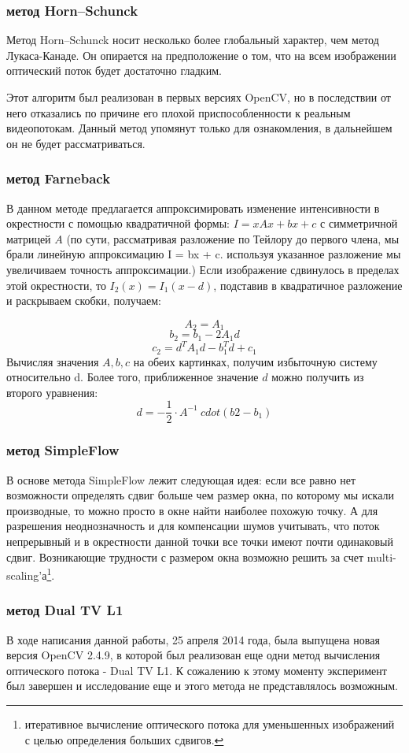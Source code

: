 \subsubsection{метод Horn–Schunck}
Метод Horn–Schunck носит несколько более глобальный характер, чем метод Лукаса-Канаде. Он опирается на предположение о том, что на всем изображении оптический поток будет достаточно гладким.

Этот алгоритм был реализован в первых версиях OpenCV, но в последствии от него отказались по причине его плохой приспособленности к реальным видеопотокам. Данный метод упомянут только для ознакомления, в дальнейшем он не будет рассматриваться. 

\subsubsection{метод Farneback}
В данном методе предлагается аппроксимировать изменение интенсивности в окрестности с помощью квадратичной формы: $I = xAx + bx + c$ с симметричной матрицей $A$ (по сути, рассматривая разложение по Тейлору до первого члена, мы брали линейную аппроксимацию I = bx + c. используя указанное разложение мы увеличиваем точность аппроксимации.)
Если изображение сдвинулось в пределах этой окрестности, то 
$I_2 (x) = I_1 (x-d)$, подставив в квадратичное разложение и раскрываем скобки, получаем:

$$ A_2 = A_1 $$
$$ b_2 = b_1 - 2A_1d $$
$$ c_2 = d^TA_1d - b_1^Td + c_1 $$
Вычисляя значения $A, b, c$ на обеих картинках, получим избыточную систему относительно d. Более того, приближенное значение $d$ можно получить из второго уравнения: 
$$ d = -\frac{1}{2} \cdot A^{-1} \ cdot (b2 - b_1) $$

\subsubsection{метод SimpleFlow}
В основе метода SimpleFlow лежит следующая идея: если все равно нет возможности определять сдвиг больше чем размер окна, по которому мы искали производные, то можно просто в окне найти наиболее похожую точку. А для разрешения неоднозначность и для компенсации шумов учитывать, что поток непрерывный и в окрестности данной точки все точки имеют почти одинаковый сдвиг. Возникающие трудности с размером окна возможно решить за счет multi-scaling'а\footnote{итеративное вычисление оптического потока для уменьшенных изображений с целью определения больших сдвигов.}.

\subsubsection{метод Dual TV L1}
В ходе написания данной работы, 25 апреля 2014 года, была выпущена новая версия OpenCV 2.4.9, в которой был реализован еще одни метод вычисления оптического потока - Dual TV L1. 
К сожалению к этому моменту эксперимент был завершен и исследование еще и этого метода не представлялось возможным. 

